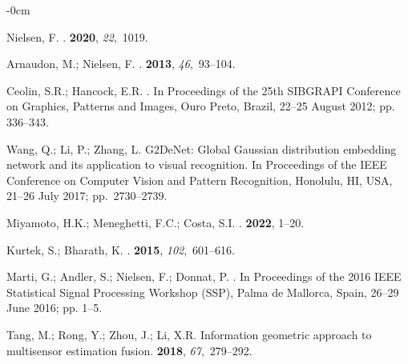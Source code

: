 \documentclass[entropy,article,accept,oneauthor,pdftex,entropy]{Definitions/mdpi}
\begin{document}
\begin{adjustwidth}{-\extralength}{0cm}
\begin{thebibliography}{999}
Nielsen, F.
.
 {\bf 2020}, {\em 22},~1019.

Arnaudon, M.; Nielsen, F.
.
 {\bf 2013}, {\em 46},~93--104.

Ceolin, S.R.; Hancock, E.R.
.
\newblock In Proceedings of the 25th SIBGRAPI Conference on Graphics, Patterns
  and Images, {Ouro Preto, Brazil, 22--25 August 2012;} pp. 336--343.

Wang, Q.; Li, P.; Zhang, L.
\newblock G2DeNet: Global Gaussian distribution embedding network and its
  application to visual recognition.
\newblock In Proceedings of the IEEE Conference on Computer
  Vision and Pattern Recognition, { Honolulu, HI, USA, 21--26 July 2017;} \mbox{pp. 2730--2739}.

Miyamoto, H.K.; Meneghetti, F.C.; Costa, S.I.
.
 {\bf 2022}, {1--20.} %

Kurtek, S.; Bharath, K.
.
 {\bf 2015}, {\em 102},~601--616.

Marti, G.; Andler, S.; Nielsen, F.; Donnat, P.
.
\newblock In Proceedings of the 2016 IEEE Statistical Signal Processing
  Workshop (SSP), {Palma de Mallorca, Spain, 26--29 June 2016;} pp. 1--5.

Tang, M.; Rong, Y.; Zhou, J.; Li, X.R.
\newblock Information geometric approach to multisensor estimation fusion.
 {\bf 2018}, {\em
  67},~279--292.


\end{thebibliography}
\end{adjustwidth}
\end{document}

